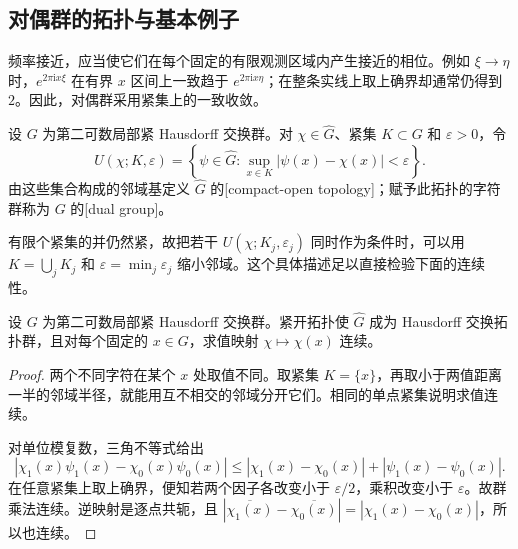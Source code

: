 \subsection{对偶群的拓扑与基本例子}
\label{b2:subsec:I20302}

频率接近，应当使它们在每个固定的有限观测区域内产生接近的相位。例如 \(\xi\to\eta\) 时，\(e^{2\pi\mathrm ix\xi}\) 在有界 \(x\) 区间上一致趋于 \(e^{2\pi\mathrm ix\eta}\)；在整条实线上取上确界却通常仍得到 \(2\)。因此，对偶群采用紧集上的一致收敛。

\begin{definition}[对偶群的紧开拓扑]
\label{b2:def:I3-dual-topology}
设 \(G\) 为第二可数局部紧 Hausdorff 交换群。对 \(\chi\in\widehat G\)、紧集 \(K\subset G\) 和 \(\varepsilon>0\)，令
\[
 U(\chi;K,\varepsilon)=
 \left\{\psi\in\widehat G:
   \sup_{x\in K}|\psi(x)-\chi(x)|<\varepsilon\right\}.
\]
由这些集合构成的邻域基定义 \(\widehat G\) 的[compact-open topology]；赋予此拓扑的字符群称为 \(G\) 的[dual group]。
\end{definition}

有限个紧集的并仍然紧，故把若干 \(U(\chi;K_j,\varepsilon_j)\) 同时作为条件时，可以用 \(K=\bigcup_jK_j\) 和 \(\varepsilon=\min_j\varepsilon_j\) 缩小邻域。这个具体描述足以直接检验下面的连续性。

\begin{proposition}[对偶群的群拓扑]
\label{b2:prop:I3-dual-topology}
设 \(G\) 为第二可数局部紧 Hausdorff 交换群。紧开拓扑使 \(\widehat G\) 成为 Hausdorff 交换拓扑群，且对每个固定的 \(x\in G\)，求值映射 \(\chi\mapsto\chi(x)\) 连续。
\end{proposition}
\begin{proof}
两个不同字符在某个 \(x\) 处取值不同。取紧集 \(K=\{x\}\)，再取小于两值距离一半的邻域半径，就能用互不相交的邻域分开它们。相同的单点紧集说明求值连续。

对单位模复数，三角不等式给出
\[
 |\chi_1(x)\psi_1(x)-\chi_0(x)\psi_0(x)|
 \le |\chi_1(x)-\chi_0(x)|+|\psi_1(x)-\psi_0(x)|.
\]
在任意紧集上取上确界，便知若两个因子各改变小于 \(\varepsilon/2\)，乘积改变小于 \(\varepsilon\)。故群乘法连续。逆映射是逐点共轭，且
\(|\overline{\chi_1(x)}-\overline{\chi_0(x)}|=|\chi_1(x)-\chi_0(x)|\)，所以也连续。
\end{proof}

